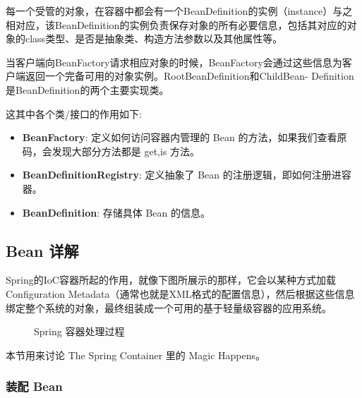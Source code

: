 每一个受管的对象，在容器中都会有一个BeanDefinition的实例（instance）与之相对应，该BeanDefinition的实例负责保存对象的所有必要信息，包括其对应的对象的class类型、是否是抽象类、构造方法参数以及其他属性等。

当客户端向BeanFactory请求相应对象的时候，BeanFactory会通过这些信息为客户端返回一个完备可用的对象实例。RootBeanDefinition和ChildBean- Definition是BeanDefinition的两个主要实现类。

这其中各个类/接口的作用如下:
\begin{itemize}
    \item \textbf{BeanFactory}: 定义如何访问容器内管理的 Bean 的方法，如果我们查看原码，会发现大部分方法都是 get,is 方法。
    \item \textbf{BeanDefinitionRegistry}: 定义抽象了 Bean 的注册逻辑，即如何注册进容器。
    \item \textbf{BeanDefinition}: 存储具体 Bean 的信息。
\end{itemize}

\subsection{Bean 详解}

Spring的IoC容器所起的作用，就像下图所展示的那样，它会以某种方式加载Configuration Metadata（通常也就是XML格式的配置信息），然后根据这些信息绑定整个系统的对象，最终组装成一个可用的基于轻量级容器的应用系统。

\begin{figure}[H]
    \small
    \centering
    \caption{Spring 容器处理过程}
    \label{fig:Spring 容器处理过程}
\end{figure}

本节用来讨论 The Spring Container 里的 Magic Happens。

\subsubsection{装配 Bean}

